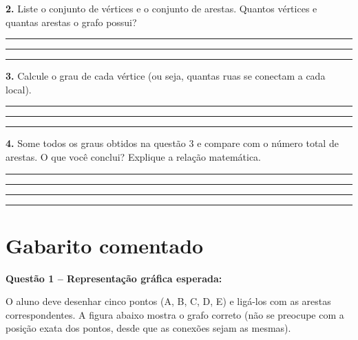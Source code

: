 \documentclass[
  12pt,
  oneside,
  a4paper,
  english,
  brazilian
  ]{abntex2}
\theoremstyle{definition}
\def\vspace#1{ }%
\begin{document}
\begin{apendicesenv}
\textbf{2.} Liste o conjunto de vértices e o conjunto de arestas. Quantos vértices e quantas arestas o grafo possui?

\vspace{0.3cm}
\noindent\rule{\textwidth}{0.4pt}\vspace{0.3cm}
\noindent\rule{\textwidth}{0.4pt}\vspace{0.3cm}
\noindent\rule{\textwidth}{0.4pt}

\textbf{3.} Calcule o grau de cada vértice (ou seja, quantas ruas se conectam a cada local).

\vspace{0.3cm}
\noindent\rule{\textwidth}{0.4pt}\vspace{0.3cm}
\noindent\rule{\textwidth}{0.4pt}\vspace{0.3cm}
\noindent\rule{\textwidth}{0.4pt}

\textbf{4.} Some todos os graus obtidos na questão 3 e compare com o número total de arestas. O que você conclui? Explique a relação matemática.

\vspace{0.3cm}
\noindent\rule{\textwidth}{0.4pt}\vspace{0.3cm}
\noindent\rule{\textwidth}{0.4pt}\vspace{0.3cm}
\noindent\rule{\textwidth}{0.4pt}\vspace{0.3cm}
\noindent\rule{\textwidth}{0.4pt}

\newpage
\section{Gabarito comentado}

\textbf{Questão 1 – Representação gráfica esperada:}

O aluno deve desenhar cinco pontos (A, B, C, D, E) e ligá-los com as arestas correspondentes. A figura abaixo mostra o grafo correto (não se preocupe com a posição exata dos pontos, desde que as conexões sejam as mesmas).


\end{apendicesenv}
\end{document}
